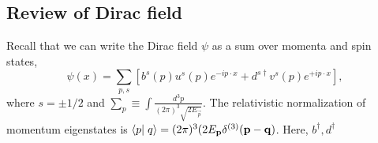 \subsection{Review of Dirac field} Recall that we can write the Dirac field $\psi$ as a sum over momenta and spin states,
\begin{equation}
    \psi(x)=\sum_{p,s}\left[ b^s(p) u^s(p) e^{-ip\cdot x}+d^{s\dagger}v^s(p) e^{+ip\cdot x}\right],
\end{equation}
where $s=\pm 1/2$ and $\sum_p\equiv \int \frac{d^3p}{(2\pi)^3 \sqrt{2E_{\vec p}}}$. The relativistic normalization of momentum eigenstates is $\braket{p}{q}=(2\pi)^3 (2E_{\vec p}\delta^{(3)}(\vec p - \vec q)$. Here, $b^\dagger,d^\dagger$